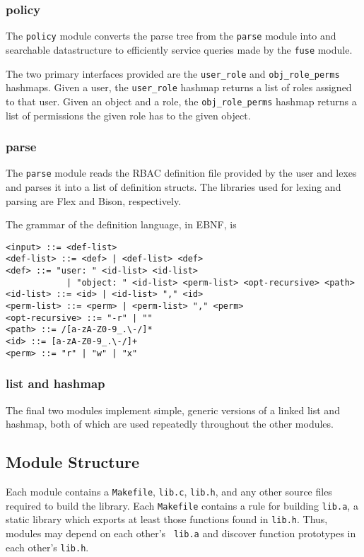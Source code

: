 \documentclass[11pt,oneside,letterpaper]{article}
\begin{document}
\subsubsection{policy}

The {\tt policy} module converts the parse tree from the {\tt parse} module
into and searchable datastructure to efficiently service queries made by the
{\tt fuse} module.

The two primary interfaces provided are the {\tt user\_role} and {\tt obj\_role\_perms} hashmaps. Given a user, the {\tt user\_role} hashmap
returns a list of roles assigned to that user. Given an object and a role,
the {\tt obj\_role\_perms} hashmap returns a list of permissions the given
role has to the given object.

\subsubsection{parse}

The {\tt parse} module reads the RBAC definition file provided by the user
and lexes and parses it into a list of definition structs. The libraries
used for lexing and parsing are Flex and Bison, respectively.

The grammar of the definition language, in EBNF, is

\begin{lstlisting}
<input> ::= <def-list>
<def-list> ::= <def> | <def-list> <def>
<def> ::= "user: " <id-list> <id-list>
            | "object: " <id-list> <perm-list> <opt-recursive> <path>
<id-list> ::= <id> | <id-list> "," <id>
<perm-list> ::= <perm> | <perm-list> "," <perm>
<opt-recursive> ::= "-r" | ""
<path> ::= /[a-zA-Z0-9_.\-/]*
<id> ::= [a-zA-Z0-9_.\-/]+
<perm> ::= "r" | "w" | "x"
\end{lstlisting}

\subsubsection{list and hashmap}

The final two modules implement simple, generic versions of a linked
list and hashmap, both of which are used repeatedly throughout the
other modules.

\subsection{Module Structure}

Each module contains a {\tt Makefile}, {\tt lib.c}, {\tt lib.h}, and any other
source files required to build the library. Each {\tt Makefile} contains a rule
for building {\tt lib.a}, a static library which exports at least those
functions found in {\tt lib.h}. Thus, modules may depend on each other's {\tt
lib.a} and discover function prototypes in each other's {\tt lib.h}.
\end{document}
